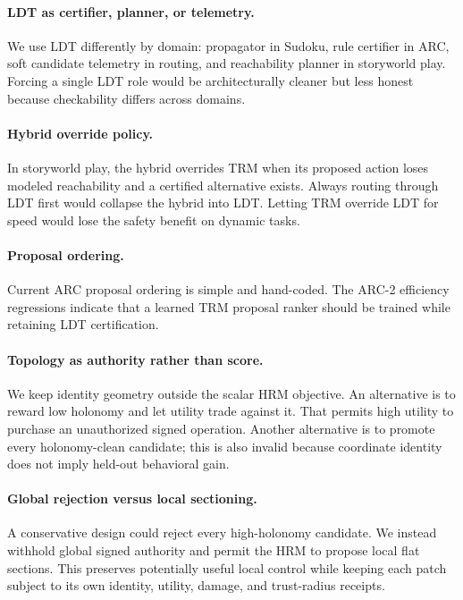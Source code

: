 \documentclass[11pt]{article}
\begin{document}
\paragraph{LDT as certifier, planner, or telemetry.}
We use LDT differently by domain: propagator in Sudoku, rule certifier in ARC, soft candidate telemetry in routing, and reachability planner in storyworld play. Forcing a single LDT role would be architecturally cleaner but less honest because checkability differs across domains.

\paragraph{Hybrid override policy.}
In storyworld play, the hybrid overrides TRM when its proposed action loses modeled reachability and a certified alternative exists. Always routing through LDT first would collapse the hybrid into LDT. Letting TRM override LDT for speed would lose the safety benefit on dynamic tasks.

\paragraph{Proposal ordering.}
Current ARC proposal ordering is simple and hand-coded. The ARC-2 efficiency regressions indicate that a learned TRM proposal ranker should be trained while retaining LDT certification.

\paragraph{Topology as authority rather than score.}
We keep identity geometry outside the scalar HRM objective. An alternative is to reward low holonomy and let
utility trade against it. That permits high utility to purchase an unauthorized signed operation. Another
alternative is to promote every holonomy-clean candidate; this is also invalid because coordinate identity does
not imply held-out behavioral gain.

\paragraph{Global rejection versus local sectioning.}
A conservative design could reject every high-holonomy candidate. We instead withhold global signed authority
and permit the HRM to propose local flat sections. This preserves potentially useful local control while keeping
each patch subject to its own identity, utility, damage, and trust-radius receipts.
\end{document}

